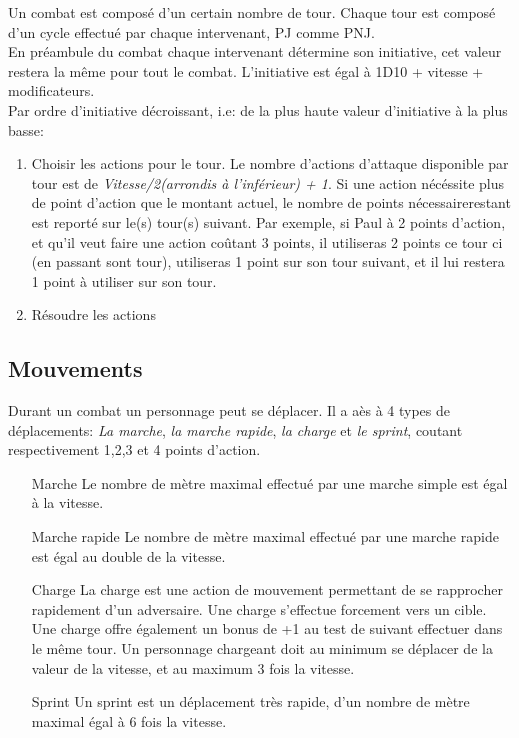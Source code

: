 Un combat est composé d'un certain nombre de tour. Chaque tour est composé d'un cycle effectué par chaque intervenant, PJ comme PNJ. \\
En préambule du combat chaque intervenant détermine son initiative, cet valeur restera la même pour tout le combat. L'initiative est égal à 1D10 + vitesse + modificateurs. \\
Par ordre d'initiative décroissant, i.e: de la plus haute valeur d'initiative à la plus basse: \\
\begin{enumerate}
\item Choisir les actions pour le tour. Le nombre d'actions d'attaque disponible par tour est de \textit{Vitesse/2(arrondis à l'inférieur) + 1}. Si une action nécéssite plus de point d'action que le montant actuel, le nombre de points nécessairerestant est reporté sur le(s) tour(s) suivant. Par exemple, si Paul à 2 points d'action, et qu'il veut faire une action coûtant 3 points, il utiliseras 2 points ce tour ci (en passant sont tour), utiliseras 1 point sur son tour suivant, et il lui restera 1 point à utiliser sur son tour.

\item Résoudre les actions
\end{enumerate} 

\subsection{Mouvements}
Durant un combat un personnage peut se déplacer. Il a aès à 4 types de déplacements: \textit{La marche}, \textit{la marche rapide}, \textit{la charge} et \textit{le sprint}, coutant respectivement 1,2,3 et 4 points d'action.
\begin{itemize}
\item[Marche] Le nombre de mètre maximal effectué par une marche simple est égal à la vitesse.
\item[Marche rapide] Le nombre de mètre maximal effectué par une marche rapide est égal au double de la vitesse.
\item[Charge] La charge est une action de mouvement permettant de se rapprocher rapidement d'un adversaire. Une charge s'effectue forcement vers un cible. Une charge offre également un bonus de +1 au test de  suivant effectuer dans le même tour. Un personnage chargeant doit au minimum se déplacer de la valeur de la vitesse, et au maximum 3 fois la vitesse.
\item[Sprint] Un sprint est un déplacement très rapide, d'un nombre de mètre maximal égal à 6 fois la vitesse.
\end{itemize}

